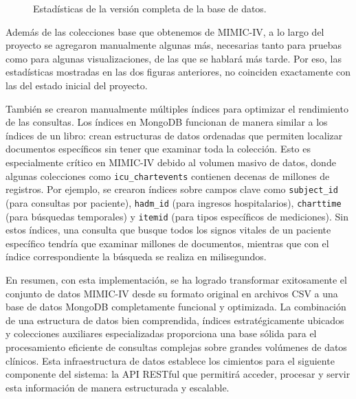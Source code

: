 \begin{figure}[H]
    \centering
    \caption{Estadísticas de la versión completa de la base de datos.}
    \label{fig:stats_full}
\end{figure}


Además de las colecciones base que obtenemos de MIMIC-IV, a lo largo del proyecto se agregaron manualmente algunas más, necesarias tanto para pruebas como para algunas visualizaciones, de las que se hablará más tarde. Por eso, las estadísticas mostradas en las dos figuras anteriores, no coinciden exactamente con las del estado inicial del proyecto. 

También se crearon manualmente múltiples índices para optimizar el rendimiento de las consultas. Los índices en MongoDB funcionan de manera similar a los índices de un libro: crean estructuras de datos ordenadas que permiten localizar documentos específicos sin tener que examinar toda la colección. Esto es especialmente crítico en MIMIC-IV debido al volumen masivo de datos, donde algunas colecciones como \texttt{icu\_chartevents} contienen decenas de millones de registros. Por ejemplo, se crearon índices sobre campos clave como \texttt{subject\_id} (para consultas por paciente), \texttt{hadm\_id} (para ingresos hospitalarios), \texttt{charttime} (para búsquedas temporales) y \texttt{itemid} (para tipos específicos de mediciones). Sin estos índices, una consulta que busque todos los signos vitales de un paciente específico tendría que examinar millones de documentos, mientras que con el índice correspondiente la búsqueda se realiza en milisegundos.


En resumen, con esta implementación, se ha logrado transformar exitosamente el conjunto de datos MIMIC-IV desde su formato original en archivos CSV a una base de datos MongoDB completamente funcional y optimizada. La combinación de una estructura de datos bien comprendida, índices estratégicamente ubicados y colecciones auxiliares especializadas proporciona una base sólida para el procesamiento eficiente de consultas complejas sobre grandes volúmenes de datos clínicos. Esta infraestructura de datos establece los cimientos para el siguiente componente del sistema: la API RESTful que permitirá acceder, procesar y servir esta información de manera estructurada y escalable.





